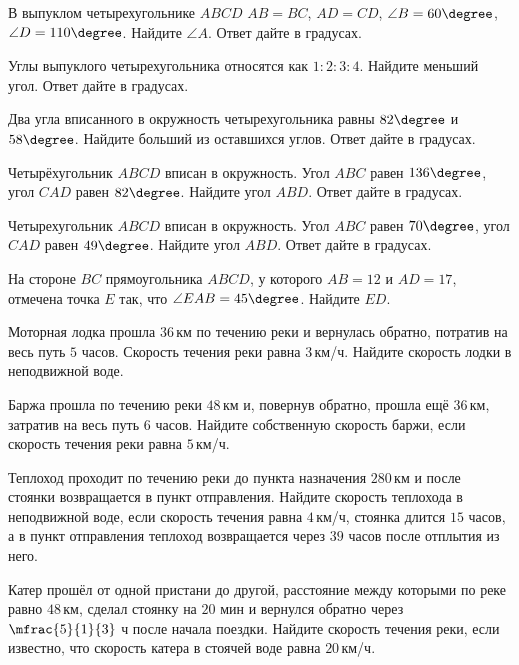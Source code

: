 \begin{class}[number=3]
	\begin{listofex}
		\item В выпуклом четырехугольнике \( ABCD \) \( AB=BC \), \( AD=CD \), \( \angle B=60\degree \), \( \angle D=110\degree \). Найдите \( \angle A \). Ответ дайте в градусах.
		\item Углы выпуклого четырехугольника относятся как \( 1:2:3:4 \). Найдите меньший угол. Ответ дайте в градусах.
		\item Два угла вписанного в окружность четырехугольника равны \( 82\degree \) и \( 58\degree \). Найдите больший из оставшихся углов. Ответ дайте в градусах.
		\item Четырёхугольник \( ABCD \) вписан в окружность. Угол \( ABC \) равен \( 136\degree \), угол \( CAD \) равен \( 82\degree \). Найдите угол \( ABD \). Ответ дайте в градусах.
		\item Четырехугольник \( ABCD \) вписан в окружность. Угол \( ABC \) равен \( 70\degree \), угол \( CAD \) равен \( 49\degree \). Найдите угол \( ABD \). Ответ дайте в градусах.
		\item На стороне \( BC \) прямоугольника \( ABCD \), у которого \( AB=12 \) и \( AD=17 \), отмечена точка \( E \) так, что \( \angle EAB=45\degree \). Найдите \( ED \).
		\item Моторная лодка прошла \( 36 \) км по течению реки и вернулась обратно, потратив на весь путь \( 5 \) часов. Скорость течения реки равна \( 3 \) км/ч. Найдите скорость лодки в неподвижной воде.
		\item Баржа прошла по течению реки \( 48 \) км и, повернув обратно, прошла ещё \( 36 \) км, затратив на весь путь \( 6 \) часов. Найдите собственную скорость баржи, если скорость течения реки равна \( 5 \) км/ч.
		\item Теплоход проходит по течению реки до пункта назначения \( 280 \) км и после стоянки возвращается в пункт отправления. Найдите скорость теплохода в неподвижной воде, если скорость течения равна \( 4 \) км/ч, стоянка длится \( 15 \) часов, а в пункт отправления теплоход возвращается через \( 39 \) часов после отплытия из него.
		\item Катер прошёл от одной пристани до другой, расстояние между которыми по реке равно \( 48 \) км, сделал стоянку на \( 20 \) мин и вернулся обратно через \( \mfrac{5}{1}{3} \) ч после начала поездки. Найдите скорость течения реки, если известно, что скорость катера в стоячей воде равна \( 20 \) км/ч.

\end{listofex}
\end{class}
